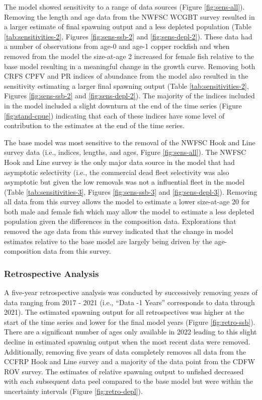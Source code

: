 \documentclass[11pt,
  english,
  letterpaper,
]{article}
\begin{document}
The model showed sensitivity to a range of data sources (Figure \ref{fig:sens-all}). Removing the length and age data from the NWFSC WCGBT survey resulted in a larger estimate of final spawning output and a less depleted population (Table \ref{tab:sensitivities-2}, Figures \ref{fig:sens-ssb-2} and \ref{fig:sens-depl-2}). These data had a number of observations from age-0 and age-1 copper rockfish and when removed from the model the size-at-age 2 increased for female fish relative to the base model resulting in a meaningful change in the growth curve. Removing both CRFS CPFV and PR indices of abundance from the model also resulted in the sensitivity estimating a larger final spawning output (Table \ref{tab:sensitivities-2}, Figures \ref{fig:sens-ssb-2} and \ref{fig:sens-depl-2}). The majority of the indices included in the model included a slight downturn at the end of the time series (Figure \ref{fig:stand-cpue}) indicating that each of these indices have some level of contribution to the estimates at the end of the time series.

The base model was most sensitive to the removal of the NWFSC Hook and Line survey data (i.e., indices, lengths, and ages, Figure \ref{fig:sens-all}). The NWFSC Hook and Line survey is the only major data source in the model that had asymptotic selectivity (i.e., the commercial dead fleet selectivity was also asymptotic but given the low removals was not a influential fleet in the model (Table \ref{tab:sensitivities-3}, Figures \ref{fig:sens-ssb-3} and \ref{fig:sens-depl-3}). Removing all data from this survey allows the model to estimate a lower size-at-age 20 for both male and female fish which may allow the model to estimate a less depleted population given the differences in the composition data. Explorations that removed the age data from this survey indicated that the change in model estimates relative to the base model are largely being driven by the age-composition data from this survey.

\hypertarget{retrospective-analysis}{%
\subsubsection{Retrospective Analysis}\label{retrospective-analysis}}

A five-year retrospective analysis was conducted by successively removing years of data ranging from 2017 - 2021 (i.e., ``Data -1 Years'' corresponds to data through 2021). The estimated spawning output for all retrospectives was higher at the start of the time series and lower for the final model years (Figure \ref{fig:retro-ssb}). There are a significant number of ages only available in 2022 leading to this slight decline in estimated spawning output when the most recent data were removed. Additionally, removing five years of data completely removes all data from the CCFRP Hook and Line survey and a majority of the data point from the CDFW ROV survey. The estimates of relative spawning output to unfished decreased with each subsequent data peel compared to the base model but were within the uncertainty intervals (Figure \ref{fig:retro-depl}).
\end{document}
